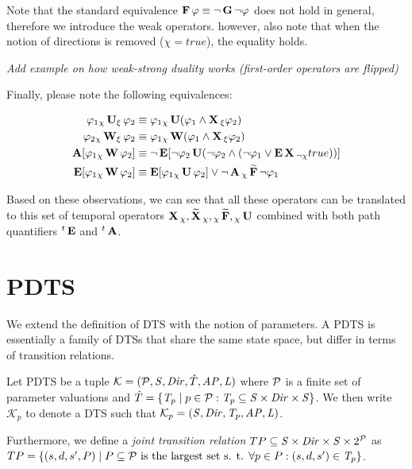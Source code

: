 Note that the standard equivalence $\operatorname{\mathbf{F}} \varphi \equiv \neg \operatorname{\mathbf{G}} \neg \varphi$ does not hold in general, therefore we introduce the weak operators. however, also note that when the notion of directions is removed ($\chi = true$), the equality holds. 

\emph{Add example on how weak-strong duality works (first-order operators are flipped)}

Finally, please note the following equivalences:

\begin{align*}
	\varphi_1 {}_{\chi}\operatorname{\mathbf{U}}_{\xi} \varphi_2						& \equiv \varphi_1 {}_{\chi}\operatorname{\mathbf{U}} (\varphi_1 \land \operatorname{\mathbf{X}}{}_{\xi} \varphi_2)  \\
	\varphi_2 {}_{\chi}\operatorname{\mathbf{W}}_{\xi} \varphi_2 				   & \equiv \varphi_1 {}_{\chi}\operatorname{\mathbf{W}} (\varphi_1 \land \operatorname{\mathbf{X}}{}_{\xi} \varphi_2) \\
	\operatorname{\mathbf{A}}[\varphi_1 {}_{\chi}\operatorname{\mathbf{W}} \varphi_2] 				  & \equiv \neg \operatorname{\mathbf{E}}[ \neg \varphi_2 \operatorname{\mathbf{U}} (\neg \varphi_2 \land (\neg \varphi_1 \lor \operatorname{\mathbf{E}} \operatorname{\mathbf{X}}{}_{\neg\chi} true)) ] \\
	\operatorname{\mathbf{E}}[\varphi_1 {}_{\chi}\operatorname{\mathbf{W}} \varphi_2] 				  & \equiv \operatorname{\mathbf{E}}[\varphi_1 {}_{\chi}\operatorname{\mathbf{U}} \varphi_2] \lor \neg \operatorname{\mathbf{A}} {}_{\chi}\operatorname{\mathbf{\widetilde{F}}} \neg \varphi_1 \\
\end{align*}

Based on these observations, we can see that all these operators can be translated to this set of temporal operators $\operatorname{\mathbf{X}}{}_{\chi}, \operatorname{\mathbf{\widetilde{X}}}{}_{\chi}, {}_{\chi}\operatorname{\mathbf{\widetilde{F}}}, {}_{\chi}\operatorname{\mathbf{U}}$ combined with both path quantifiers ${}^{t}\operatorname{\mathbf{E}}$ and ${}^{t}\operatorname{\mathbf{A}}$.

\section{\Acl{PDTS}}

We extend the definition of \ac{DTS} with the notion of parameters. A \ac{PDTS} is essentially a family of \acp{DTS} that share the same state space, but differ in terms of transition relations.

Let \acl{PDTS} be a tuple $\mathcal{K} = (\mathcal{P}, \mathit{S}, \mathit{Dir}, \hat{T}, \mathit{AP}, \mathit{L})$  where $\mathcal{P}$ is a finite set of parameter valuations and $\hat{T} = \{ \mathit{T}_p \mid p \in \mathcal{P} : \mathit{T}_p \subseteq \mathit{S} \times \mathit{Dir} \times \mathit{S} \}$. We then write $\mathcal{K}_p$ to denote a \ac{DTS} such that $\mathcal{K}_p = (\mathit{S}, \mathit{Dir}, \mathit{T}_p, \mathit{AP}, \mathit{L})$.

Furthermore, we define a \emph{joint transition relation} $TP \subseteq \mathit{S} \times \mathit{Dir} \times \mathit{S} \times 2^{\mathcal{P}}$ as $TP = \{ (s, d, s', P) \mid P \subseteq \mathcal{P} \text{ is the largest set s. t. } \forall p \in P : (s, d, s') \in \mathit{T}_p \}$.

